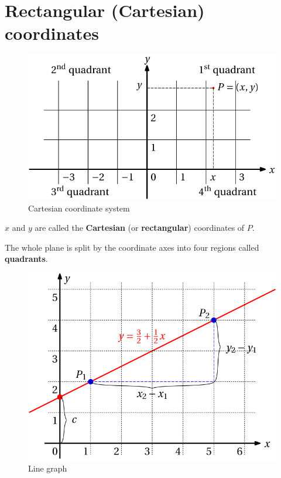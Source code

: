 \documentclass[
  12pt,
  oneside]{book}
\theoremstyle{definition}
\theoremstyle{definition}
\theoremstyle{definition}
\theoremstyle{definition}
\theoremstyle{remark}
\begin{document}
\chapter{Rectangular (Cartesian) coordinates}\label{rectangular-cartesian-coordinates}

\begin{figure}

{\centering \includegraphics{t16-cart} 

}

\caption{Cartesian coordinate system}\label{fig:unnamed-chunk-8}
\end{figure}

\(x\) and \(y\) are called the \textbf{Cartesian} (or \textbf{rectangular}) coordinates of \(P\).

The whole plane is split by the coordinate axes into four regions called \textbf{quadrants}.

\begin{figure}

{\centering \includegraphics{t16-line} 

}

\caption{Line graph}\label{fig:unnamed-chunk-9}
\end{figure}
\end{document}
